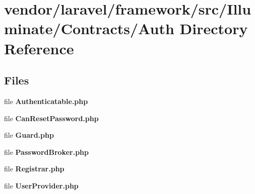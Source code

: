 \section{vendor/laravel/framework/src/\+Illuminate/\+Contracts/\+Auth Directory Reference}
\label{dir_0ceaabf2315f8896214f1d8c058358fc}
\subsection*{Files}
\begin{DoxyCompactItemize}
\item 
file {\bf Authenticatable.\+php}
\item 
file {\bf Can\+Reset\+Password.\+php}
\item 
file {\bf Guard.\+php}
\item 
file {\bf Password\+Broker.\+php}
\item 
file {\bf Registrar.\+php}
\item 
file {\bf User\+Provider.\+php}
\end{DoxyCompactItemize}
